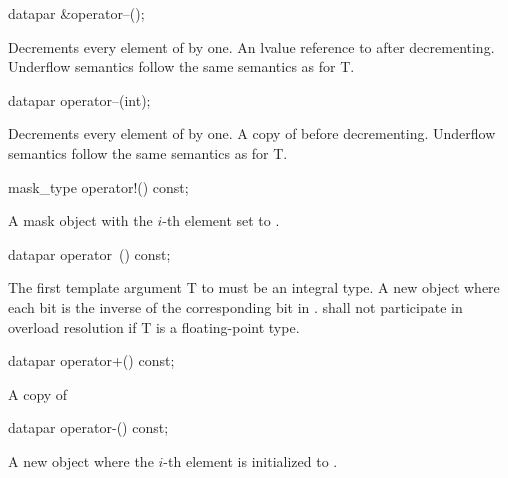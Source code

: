 \begin{itemdecl}
datapar &operator--();
\end{itemdecl}
\begin{itemdescr}
  \pnum\effects Decrements every element of  by one.
  \pnum\returns An lvalue reference to  after decrementing.
  \pnum\remarks Underflow semantics follow the same semantics as for \type T.
\end{itemdescr}

\begin{itemdecl}
datapar operator--(int);
\end{itemdecl}
\begin{itemdescr}
  \pnum\effects Decrements every element of  by one.
  \pnum\returns A copy of  before decrementing.
  \pnum\remarks Underflow semantics follow the same semantics as for \type T.
\end{itemdescr}

\begin{itemdecl}
mask_type operator!() const;
\end{itemdecl}
\begin{itemdescr}
  \pnum\returns A mask object with the $i$-th element set to  \foralli.
\end{itemdescr}

\begin{itemdecl}
datapar operator~() const;
\end{itemdecl}
\begin{itemdescr}
  \pnum\requires The first template argument \type T to \datapar must be an integral type.
  \pnum\returns A new \datapar object where each bit is the inverse of the corresponding bit in .
  \pnum\remarks \datapar{} shall not participate in overload resolution if \type T is a floating-point type.
\end{itemdescr}

\begin{itemdecl}
datapar operator+() const;
\end{itemdecl}
\begin{itemdescr}
  \pnum \returns A copy of 
\end{itemdescr}

\begin{itemdecl}
datapar operator-() const;
\end{itemdecl}
\begin{itemdescr}
  \pnum\returns A new \datapar object where the $i$-th element is initialized to  \foralli.
\end{itemdescr}

